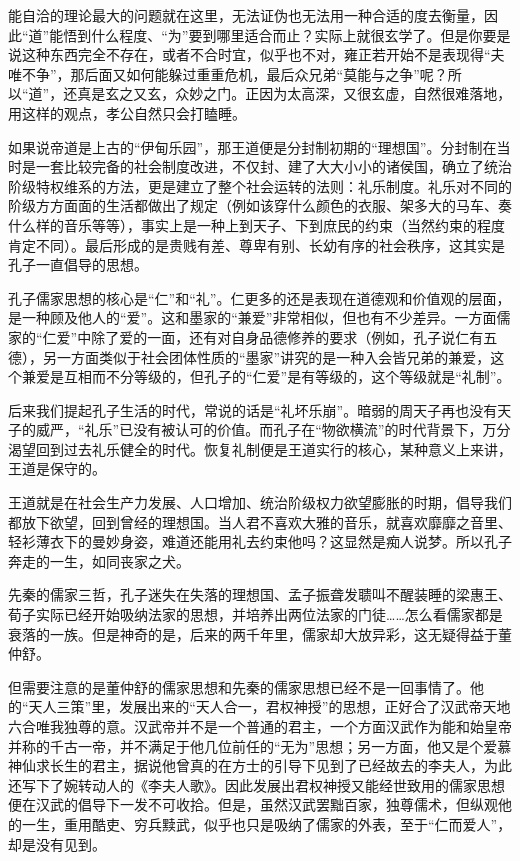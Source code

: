\documentclass[]{book}
\begin{document}
能自洽的理论最大的问题就在这里，无法证伪也无法用一种合适的度去衡量，因此``道''能悟到什么程度、``为''要到哪里适合而止？实际上就很玄学了。但是你要是说这种东西完全不存在，或者不合时宜，似乎也不对，雍正若开始不是表现得``夫唯不争''，那后面又如何能躲过重重危机，最后众兄弟``莫能与之争''呢？所以``道''，还真是玄之又玄，众妙之门。正因为太高深，又很玄虚，自然很难落地，用这样的观点，孝公自然只会打瞌睡。

如果说帝道是上古的``伊甸乐园''，那王道便是分封制初期的``理想国''。分封制在当时是一套比较完备的社会制度改进，不仅封、建了大大小小的诸侯国，确立了统治阶级特权维系的方法，更是建立了整个社会运转的法则：礼乐制度。礼乐对不同的阶级方方面面的生活都做出了规定（例如该穿什么颜色的衣服、架多大的马车、奏什么样的音乐等等），事实上是一种上到天子、下到庶民的约束（当然约束的程度肯定不同）。最后形成的是贵贱有差、尊卑有别、长幼有序的社会秩序，这其实是孔子一直倡导的思想。

孔子儒家思想的核心是``仁''和``礼''。仁更多的还是表现在道德观和价值观的层面，是一种顾及他人的``爱''。这和墨家的``兼爱''非常相似，但也有不少差异。一方面儒家的``仁爱''中除了爱的一面，还有对自身品德修养的要求（例如，孔子说仁有五德），另一方面类似于社会团体性质的``墨家''讲究的是一种入会皆兄弟的兼爱，这个兼爱是互相而不分等级的，但孔子的``仁爱''是有等级的，这个等级就是``礼制''。

后来我们提起孔子生活的时代，常说的话是``礼坏乐崩''。暗弱的周天子再也没有天子的威严，``礼乐''已没有被认可的价值。而孔子在``物欲横流''的时代背景下，万分渴望回到过去礼乐健全的时代。恢复礼制便是王道实行的核心，某种意义上来讲，王道是保守的。

王道就是在社会生产力发展、人口增加、统治阶级权力欲望膨胀的时期，倡导我们都放下欲望，回到曾经的理想国。当人君不喜欢大雅的音乐，就喜欢靡靡之音里、轻衫薄衣下的曼妙身姿，难道还能用礼去约束他吗？这显然是痴人说梦。所以孔子奔走的一生，如同丧家之犬。

先秦的儒家三哲，孔子迷失在失落的理想国、孟子振聋发聩叫不醒装睡的梁惠王、荀子实际已经开始吸纳法家的思想，并培养出两位法家的门徒\ldots{}\ldots{}怎么看儒家都是衰落的一族。但是神奇的是，后来的两千年里，儒家却大放异彩，这无疑得益于董仲舒。

但需要注意的是董仲舒的儒家思想和先秦的儒家思想已经不是一回事情了。他的``天人三策''里，发展出来的``天人合一，君权神授''的思想，正好合了汉武帝天地六合唯我独尊的意。汉武帝并不是一个普通的君主，一个方面汉武作为能和始皇帝并称的千古一帝，并不满足于他几位前任的``无为''思想；另一方面，他又是个爱慕神仙求长生的君主，据说他曾真的在方士的引导下见到了已经故去的李夫人，为此还写下了婉转动人的《李夫人歌》。因此发展出君权神授又能经世致用的儒家思想便在汉武的倡导下一发不可收拾。但是，虽然汉武罢黜百家，独尊儒术，但纵观他的一生，重用酷吏、穷兵黩武，似乎也只是吸纳了儒家的外表，至于``仁而爱人''，却是没有见到。
\end{document}
